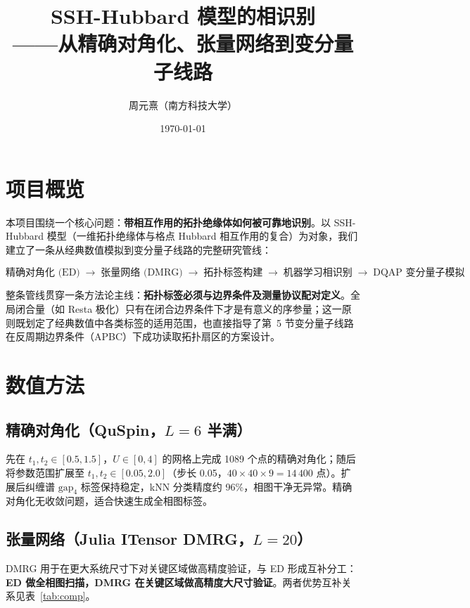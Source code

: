 \documentclass[11pt,a4paper]{article}
\title{SSH-Hubbard 模型的相识别\\——从精确对角化、张量网络到变分量子线路}
\author{周元熹（南方科技大学）}
\date{\today}
\begin{document}
\maketitle

\section{项目概览}

本项目围绕一个核心问题：\textbf{带相互作用的拓扑绝缘体如何被可靠地识别}。以 SSH-Hubbard 模型（一维拓扑绝缘体与格点 Hubbard 相互作用的复合）为对象，我们建立了一条从经典数值模拟到变分量子线路的完整研究管线：

\[
\text{精确对角化 (ED)} \;\rightarrow\; \text{张量网络 (DMRG)} \;\rightarrow\; \text{拓扑标签构建} \;\rightarrow\; \text{机器学习相识别} \;\rightarrow\; \text{DQAP 变分量子模拟}
\]

整条管线贯穿一条方法论主线：\textbf{拓扑标签必须与边界条件及测量协议配对定义}。全局闭合量（如 Resta 极化）只有在闭合边界条件下才是有意义的序参量；这一原则既划定了经典数值中各类标签的适用范围，也直接指导了第~5 节变分量子线路在反周期边界条件（APBC）下成功读取拓扑扇区的方案设计。

\section{数值方法}

\subsection{精确对角化（QuSpin，$L=6$ 半满）}

先在 $t_1,t_2\in[0.5,1.5]$，$U\in[0,4]$ 的网格上完成 1089 个点的精确对角化；随后将参数范围扩展至 $t_1,t_2\in[0.05,2.0]$（步长 0.05，$40\times40\times9=14\,400$ 点）。扩展后纠缠谱 $\mathrm{gap}_4$ 标签保持稳定，kNN 分类精度约 96\%，相图干净无异常。精确对角化无收敛问题，适合快速生成全相图标签。

\subsection{张量网络（Julia ITensor DMRG，$L=20$）}

DMRG 用于在更大系统尺寸下对关键区域做高精度验证，与 ED 形成互补分工：\textbf{ED 做全相图扫描，DMRG 在关键区域做高精度大尺寸验证}。两者优势互补关系见表~\ref{tab:comp}。
\end{document}
